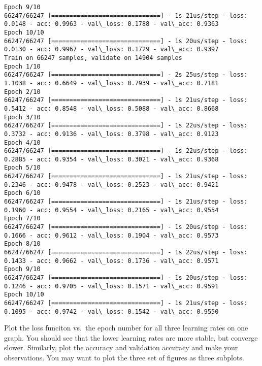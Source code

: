 \documentclass[11pt]{article}
\begin{document}
\begin{Verbatim}[commandchars=\\\{\}]
Epoch 9/10
66247/66247 [==============================] - 1s 21us/step - loss: 0.0148 - acc: 0.9963 - val\_loss: 0.1788 - val\_acc: 0.9363
Epoch 10/10
66247/66247 [==============================] - 1s 20us/step - loss: 0.0130 - acc: 0.9967 - val\_loss: 0.1729 - val\_acc: 0.9397
Train on 66247 samples, validate on 14904 samples
Epoch 1/10
66247/66247 [==============================] - 2s 25us/step - loss: 1.1038 - acc: 0.6649 - val\_loss: 0.7939 - val\_acc: 0.7181
Epoch 2/10
66247/66247 [==============================] - 1s 21us/step - loss: 0.5412 - acc: 0.8548 - val\_loss: 0.5088 - val\_acc: 0.8668
Epoch 3/10
66247/66247 [==============================] - 1s 22us/step - loss: 0.3732 - acc: 0.9136 - val\_loss: 0.3798 - val\_acc: 0.9123
Epoch 4/10
66247/66247 [==============================] - 1s 22us/step - loss: 0.2885 - acc: 0.9354 - val\_loss: 0.3021 - val\_acc: 0.9368
Epoch 5/10
66247/66247 [==============================] - 1s 21us/step - loss: 0.2346 - acc: 0.9478 - val\_loss: 0.2523 - val\_acc: 0.9421
Epoch 6/10
66247/66247 [==============================] - 1s 21us/step - loss: 0.1960 - acc: 0.9554 - val\_loss: 0.2165 - val\_acc: 0.9554
Epoch 7/10
66247/66247 [==============================] - 1s 20us/step - loss: 0.1666 - acc: 0.9612 - val\_loss: 0.1904 - val\_acc: 0.9573
Epoch 8/10
66247/66247 [==============================] - 1s 22us/step - loss: 0.1433 - acc: 0.9662 - val\_loss: 0.1736 - val\_acc: 0.9571
Epoch 9/10
66247/66247 [==============================] - 1s 20us/step - loss: 0.1246 - acc: 0.9705 - val\_loss: 0.1571 - val\_acc: 0.9591
Epoch 10/10
66247/66247 [==============================] - 1s 21us/step - loss: 0.1095 - acc: 0.9742 - val\_loss: 0.1542 - val\_acc: 0.9550

    \end{Verbatim}

    Plot the loss funciton vs.~the epoch number for all three learning rates
on one graph. You should see that the lower learning rates are more
stable, but converge slower. Similarly, plot the accuracy and validation
accuracy and make your observations. You may want to plot the three set
of figures as three subplots.
\end{document}
